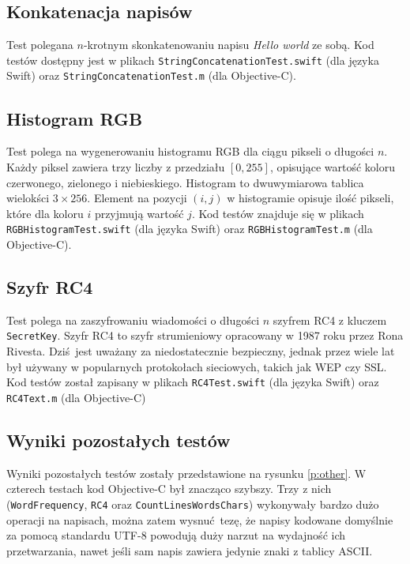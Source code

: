 \documentclass[mgr, shortabstract]{iithesis}
\begin{document}
\subsection{Konkatenacja napisów}

Test polegana $n$-krotnym skonkatenowaniu napisu \textit{Hello world} ze sobą. Kod testów dostępny jest w plikach \texttt{StringConcatenationTest.swift} (dla języka Swift) oraz \texttt{StringConcatenationTest.m} (dla Objective-C).

\subsection{Histogram RGB}

Test polega na wygenerowaniu histogramu RGB dla ciągu pikseli o długości $n$. Każdy piksel zawiera trzy liczby z przedziału $\left[0, 255\right]$, opisujące wartość koloru czerwonego, zielonego i niebieskiego. Histogram to dwuwymiarowa tablica wielokści $3 \times 256$. Element na pozycji $(i, j)$ w histogramie opisuje ilość pikseli, które dla koloru $i$ przyjmują wartość $j$. Kod testów znajduje się w plikach \texttt{RGBHistogramTest.swift} (dla języka Swift) oraz \texttt{RGBHistogramTest.m} (dla Objective-C).

\subsection{Szyfr RC4}

Test polega na zaszyfrowaniu wiadomości o długości $n$ szyfrem RC4 z kluczem \texttt{SecretKey}. Szyfr RC4 to szyfr strumieniowy opracowany w 1987 roku przez Rona Rivesta. Dziś jest uważany za niedostatecznie bezpieczny, jednak przez wiele lat był używany w popularnych protokołach sieciowych, takich jak WEP czy SSL. Kod testów został zapisany w plikach \texttt{RC4Test.swift} (dla języka Swift) oraz \texttt{RC4Text.m} (dla Objective-C)

\subsection{Wyniki pozostałych testów}

Wyniki pozostałych testów zostały przedstawione na rysunku \ref{p:other}. W czterech testach kod Objective-C był znacząco szybszy. Trzy z nich (\texttt{WordFrequency}, \texttt{RC4} oraz \texttt{CountLinesWordsChars}) wykonywały bardzo dużo operacji na napisach, można zatem wysnuć tezę, że napisy kodowane domyślnie za pomocą standardu UTF-8 powodują duży narzut na wydajność ich przetwarzania, nawet jeśli sam napis zawiera jedynie znaki z tablicy ASCII.
\end{document}
